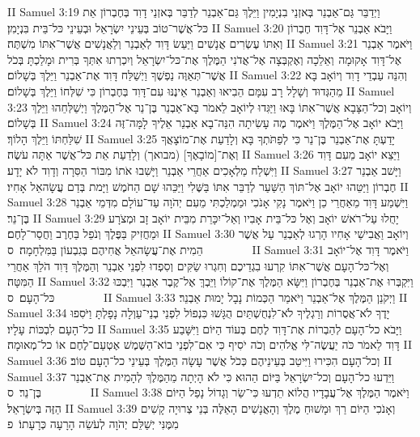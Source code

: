 II Samuel 3:19	וַיְדַבֵּר גַּם־אַבְנֵר בְּאזְנֵי בִנְיָמִין וַיֵּלֶךְ גַּם־אַבְנֵר לְדַבֵּר בְּאזְנֵי דָוִד בְּחֶבְרוֹן אֵת כּל־אֲשֶׁר־טוֹב בְּעֵינֵי יִשְׂרָאֵל וּבְעֵינֵי כּל־בֵּית בִּנְיָמִן׃
II Samuel 3:20	וַיָּבֹא אַבְנֵר אֶל־דָּוִד חֶבְרוֹן וְאִתּוֹ עֶשְׂרִים אֲנָשִׁים וַיַּעַשׂ דָּוִד לְאַבְנֵר וְלַאֲנָשִׁים אֲשֶׁר־אִתּוֹ מִשְׁתֶּה׃
II Samuel 3:21	וַיֹּאמֶר אַבְנֵר אֶל־דָּוִד אָקוּמָה  וְאֵלֵכָה וְאֶקְבְּצָה אֶל־אֲדֹנִי הַמֶּלֶךְ אֶת־כּל־יִשְׂרָאֵל וְיִכְרְתוּ אִתְּךָ בְּרִית וּמָלַכְתָּ בְּכֹל אֲשֶׁר־תְּאַוֶּה נַפְשֶׁךָ וַיְשַׁלַּח דָּוִד אֶת־אַבְנֵר וַיֵּלֶךְ בְּשָׁלוֹם׃
II Samuel 3:22	וְהִנֵּה עַבְדֵי דָוִד וְיוֹאָב בָּא מֵהַגְּדוּד וְשָׁלָל רָב עִמָּם הֵבִיאוּ וְאַבְנֵר אֵינֶנּוּ עִם־דָּוִד בְּחֶבְרוֹן כִּי שִׁלְּחוֹ וַיֵּלֶךְ בְּשָׁלוֹם׃
II Samuel 3:23	וְיוֹאָב וְכל־הַצָּבָא אֲשֶׁר־אִתּוֹ בָּאוּ וַיַּגִּדוּ לְיוֹאָב לֵאמֹר בָּא־אַבְנֵר בֶּן־נֵר אֶל־הַמֶּלֶךְ וַיְשַׁלְּחֵהוּ וַיֵּלֶךְ בְּשָׁלוֹם׃
II Samuel 3:24	וַיָּבֹא יוֹאָב אֶל־הַמֶּלֶךְ וַיֹּאמֶר מֶה עָשִׂיתָה הִנֵּה־בָא אַבְנֵר אֵלֶיךָ לָמָּה־זֶּה שִׁלַּחְתּוֹ וַיֵּלֶךְ הָלוֹךְ׃
II Samuel 3:25	יָדַעְתָּ אֶת־אַבְנֵר בֶּן־נֵר כִּי לְפַתֹּתְךָ בָּא וְלָדַעַת אֶת־מוֹצָאֲךָ וְאֶת־[מוֹבָאֶךָ] (מבואך) וְלָדַעַת אֵת כּל־אֲשֶׁר אַתָּה עֹשֶׂה׃
II Samuel 3:26	וַיֵּצֵא יוֹאָב מֵעִם דָּוִד וַיִּשְׁלַח מַלְאָכִים אַחֲרֵי אַבְנֵר וַיָּשִׁבוּ אֹתוֹ מִבּוֹר הַסִּרָה וְדָוִד לֹא יָדָע׃
II Samuel 3:27	וַיָּשׁב אַבְנֵר חֶבְרוֹן וַיַּטֵּהוּ יוֹאָב אֶל־תּוֹךְ הַשַּׁעַר לְדַבֵּר אִתּוֹ בַּשֶּׁלִי וַיַּכֵּהוּ שָׁם הַחֹמֶשׁ וַיָּמת בְּדַם עֲשָׂהאֵל אָחִיו׃
II Samuel 3:28	וַיִּשְׁמַע דָּוִד מֵאַחֲרֵי כֵן וַיֹּאמֶר נָקִי אָנֹכִי וּמַמְלַכְתִּי מֵעִם יְהֹוָה עַד־עוֹלָם מִדְּמֵי אַבְנֵר בֶּן־נֵר׃
II Samuel 3:29	יָחֻלוּ עַל־רֹאשׁ יוֹאָב וְאֶל כּל־בֵּית אָבִיו וְאַל־יִכָּרֵת מִבֵּית יוֹאָב זָב וּמְצֹרָע וּמַחֲזִיק בַּפֶּלֶךְ וְנֹפֵל בַּחֶרֶב וַחֲסַר־לָחֶם׃
II Samuel 3:30	וְיוֹאָב וַאֲבִישַׁי אָחִיו הָרְגוּ לְאַבְנֵר עַל אֲשֶׁר הֵמִית אֶת־עֲשָׂהאֵל אֲחִיהֶם בְּגִבְעוֹן בַּמִּלְחָמָה׃ {ס}        
II Samuel 3:31	וַיֹּאמֶר דָּוִד אֶל־יוֹאָב וְאֶל־כּל־הָעָם אֲשֶׁר־אִתּוֹ קִרְעוּ בִגְדֵיכֶם וְחִגְרוּ שַׂקִּים וְסִפְדוּ לִפְנֵי אַבְנֵר וְהַמֶּלֶךְ דָּוִד הֹלֵךְ אַחֲרֵי הַמִּטָּה׃
II Samuel 3:32	וַיִּקְבְּרוּ אֶת־אַבְנֵר בְּחֶבְרוֹן וַיִּשָּׂא הַמֶּלֶךְ אֶת־קוֹלוֹ וַיֵּבְךְּ אֶל־קֶבֶר אַבְנֵר וַיִּבְכּוּ כּל־הָעָם׃ {ס}        
II Samuel 3:33	וַיְקֹנֵן הַמֶּלֶךְ אֶל־אַבְנֵר וַיֹּאמַר הַכְּמוֹת נָבָל יָמוּת אַבְנֵר׃
II Samuel 3:34	יָדֶךָ לֹא־אֲסֻרוֹת וְרַגְלֶיךָ לֹא־לִנְחֻשְׁתַּיִם הֻגָּשׁוּ כִּנְפוֹל לִפְנֵי בְנֵי־עַוְלָה נָפָלְתָּ וַיֹּסִפוּ כל־הָעָם לִבְכּוֹת עָלָיו׃
II Samuel 3:35	וַיָּבֹא כל־הָעָם לְהַבְרוֹת אֶת־דָּוִד לֶחֶם בְּעוֹד הַיּוֹם וַיִּשָּׁבַע דָּוִד לֵאמֹר כֹּה יַעֲשֶׂה־לִּי אֱלֹהִים וְכֹה יֹסִיף כִּי אִם־לִפְנֵי בוֹא־הַשֶּׁמֶשׁ אֶטְעַם־לֶחֶם אוֹ כל־מְאוּמָה׃
II Samuel 3:36	וְכל־הָעָם הִכִּירוּ וַיִּיטַב בְּעֵינֵיהֶם כְּכֹל אֲשֶׁר עָשָׂה הַמֶּלֶךְ בְּעֵינֵי כל־הָעָם טוֹב׃
II Samuel 3:37	וַיֵּדְעוּ כל־הָעָם וְכל־יִשְׂרָאֵל בַּיּוֹם הַהוּא כִּי לֹא הָיְתָה מֵהַמֶּלֶךְ לְהָמִית אֶת־אַבְנֵר בֶּן־נֵר׃ {ס}        
II Samuel 3:38	וַיֹּאמֶר הַמֶּלֶךְ אֶל־עֲבָדָיו הֲלוֹא תֵדְעוּ כִּי־שַׂר וְגָדוֹל נָפַל הַיּוֹם הַזֶּה בְּיִשְׂרָאֵל׃
II Samuel 3:39	וְאָנֹכִי הַיּוֹם רַךְ וּמָשׁוּחַ מֶלֶךְ וְהָאֲנָשִׁים הָאֵלֶּה בְּנֵי צְרוּיָה קָשִׁים מִמֶּנִּי יְשַׁלֵּם יְהֹוָה לְעֹשֵׂה הָרָעָה כְּרָעָתוֹ׃ {פ}
